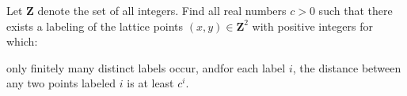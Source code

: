 Let $\mathbf{Z}$ denote the set of all integers. Find all real numbers $c > 0$ such that there exists a labeling of the lattice points $ ( x, y ) \in \mathbf{Z}^2$ with positive integers for which:

only finitely many distinct labels occur, andfor each label $i$,  the distance between any two points labeled $i$ is at least $c^i$.